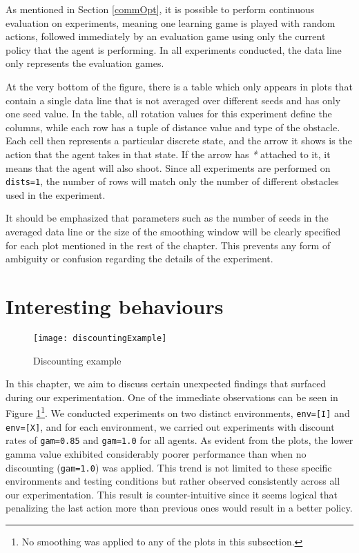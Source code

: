 As mentioned in Section \ref{commOpt}, it is possible to perform continuous evaluation on experiments, meaning one learning game is played with random actions, followed immediately by an evaluation game using only the current policy that the agent is performing. In all experiments conducted, the data line only represents the evaluation games.

At the very bottom of the figure, there is a table which only appears in plots that contain a single data line that is not averaged over different seeds and has only one seed value. In the table, all rotation values for this experiment define the columns, while each row has a tuple of distance value and type of the obstacle. Each cell then represents a particular discrete state, and the arrow it shows is the action that the agent takes in that state. If the arrow has \textit{*} attached to it, it means that the agent will also shoot. Since all experiments are performed on \texttt{dists=1}, the number of rows will match only the number of different obstacles used in the experiment.

It should be emphasized that parameters such as the number of seeds in the averaged data line or the size of the smoothing window will be clearly specified for each plot mentioned in the rest of the chapter. This prevents any form of ambiguity or confusion regarding the details of the experiment.

\section{Interesting behaviours}
\label{intbeh}
\begin{figure}[h]
    \centering
    \texttt{[image: discountingExample]}
    \caption{Discounting example}
    \label{fig:discounting_eg}
\end{figure}

In this chapter, we aim to discuss certain unexpected findings that surfaced during our experimentation. One of the immediate observations can be seen in Figure \ref{fig:discounting_eg}\footnote{No smoothing was applied to any of the plots in this subsection.}. We conducted experiments on two distinct environments, \texttt{env=[I]} and \texttt{env=[X]}, and for each environment, we carried out experiments with discount rates of \texttt{gam=0.85} and \texttt{gam=1.0} for all agents. As evident from the plots, the lower gamma value exhibited considerably poorer performance than when no discounting (\texttt{gam=1.0}) was applied. This trend is not limited to these specific environments and testing conditions but rather observed consistently across all our experimentation. This result is counter-intuitive since it seems logical that penalizing the last action more than previous ones would result in a better policy.

